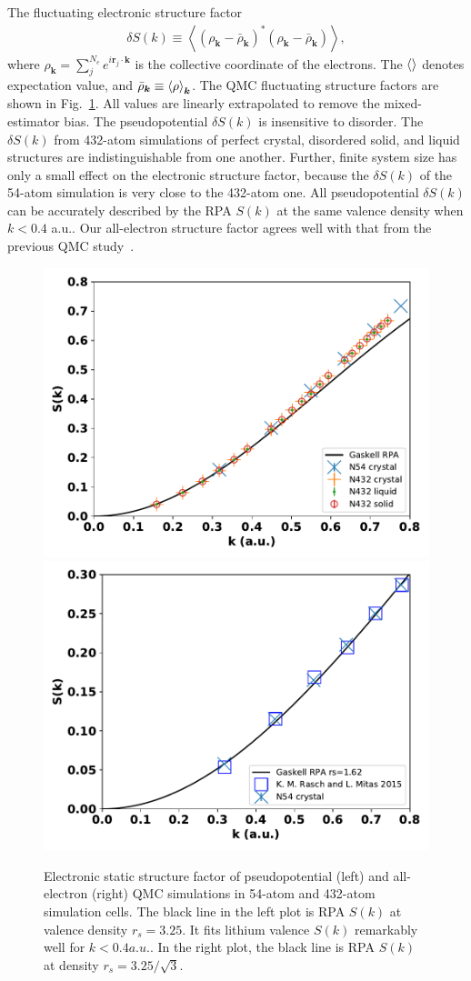 \documentclass[aps,prl,superscriptaddress]{revtex4-1}
\newcommand{\bs}{\boldsymbol}
\begin{document}
The fluctuating electronic structure factor
\begin{align}
\delta S(k) \equiv \left\langle
(\rho_{\bs{k}}-\bar{\rho}_{\bs{k}})^* (\rho_{\bs{k}}-\bar{\rho}_{\bs{k}})
\right\rangle,
\end{align}
where $\rho_{\bs{k}} = \sum\limits_j^{N_e} e^{i\bs{r}_j\cdot\bs{k}}$ is the collective coordinate of the electrons. The $\braket{}$ denotes expectation value, and $\bar{\rho}_{\bs{k}}\equiv\braket{\rho}_{\bs{k}}$. The QMC fluctuating structure factors are shown in Fig.~\ref{fig:qmc-dsk}. All values are linearly extrapolated to remove the mixed-estimator bias. The pseudopotential $\delta S(k)$ is insensitive to disorder. The $\delta S(k)$ from 432-atom simulations of perfect crystal, disordered solid, and liquid structures are indistinguishable from one another. Further, finite system size has only a small effect on the electronic structure factor, because the $\delta S(k)$ of the 54-atom simulation is very close to the 432-atom one. All pseudopotential $\delta S(k)$ can be accurately described by the RPA $S(k)$ at the same valence density when $k<0.4$ a.u.. Our all-electron structure factor agrees well with that from the previous QMC study~\cite{Rasch2015}.

\begin{figure}[h]
\includegraphics[width=0.48\linewidth]{li40bg_dsk-bfd}
\includegraphics[width=0.48\linewidth]{li40bg_dsk-fc}
\caption{Electronic static structure factor of pseudopotential (left) and all-electron (right) QMC simulations in 54-atom and 432-atom simulation cells. The black line in the left plot is RPA $S(k)$ at valence density $r_s=3.25$. It fits lithium valence $S(k)$ remarkably well for $k<0.4 a.u.$. In the right plot, the black line is RPA $S(k)$ at density $r_s=3.25/\sqrt{3}$. \label{fig:qmc-dsk}}
\end{figure}
\end{document}
